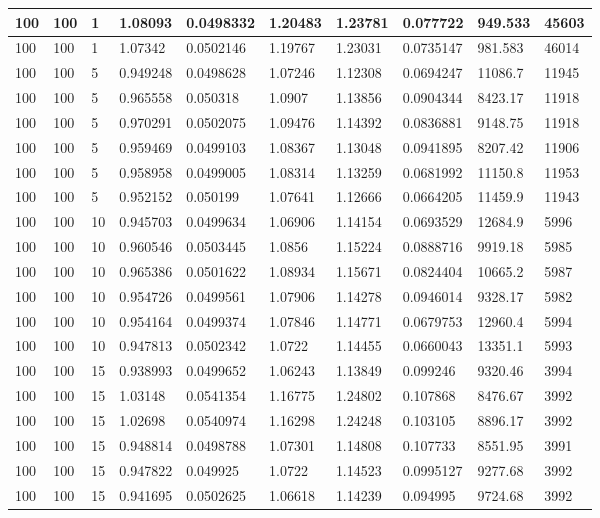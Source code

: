 \begin{landscape}
\begin{longtable}{ | l | l | l | l | l | l | l | l | l | l | }
100 & 100 & 1 & 1.08093 & 0.0498332 & 1.20483 & 1.23781 & 0.077722 & 949.533 & 45603\\ \hline
100 & 100 & 1 & 1.07342 & 0.0502146 & 1.19767 & 1.23031 & 0.0735147 & 981.583 & 46014\\ \hline
100 & 100 & 5 & 0.949248 & 0.0498628 & 1.07246 & 1.12308 & 0.0694247 & 11086.7 & 11945\\ \hline
100 & 100 & 5 & 0.965558 & 0.050318 & 1.0907 & 1.13856 & 0.0904344 & 8423.17 & 11918\\ \hline
100 & 100 & 5 & 0.970291 & 0.0502075 & 1.09476 & 1.14392 & 0.0836881 & 9148.75 & 11918\\ \hline
100 & 100 & 5 & 0.959469 & 0.0499103 & 1.08367 & 1.13048 & 0.0941895 & 8207.42 & 11906\\ \hline
100 & 100 & 5 & 0.958958 & 0.0499005 & 1.08314 & 1.13259 & 0.0681992 & 11150.8 & 11953\\ \hline
100 & 100 & 5 & 0.952152 & 0.050199 & 1.07641 & 1.12666 & 0.0664205 & 11459.9 & 11943\\ \hline
100 & 100 & 10 & 0.945703 & 0.0499634 & 1.06906 & 1.14154 & 0.0693529 & 12684.9 & 5996\\ \hline
100 & 100 & 10 & 0.960546 & 0.0503445 & 1.0856 & 1.15224 & 0.0888716 & 9919.18 & 5985\\ \hline
100 & 100 & 10 & 0.965386 & 0.0501622 & 1.08934 & 1.15671 & 0.0824404 & 10665.2 & 5987\\ \hline
100 & 100 & 10 & 0.954726 & 0.0499561 & 1.07906 & 1.14278 & 0.0946014 & 9328.17 & 5982\\ \hline
100 & 100 & 10 & 0.954164 & 0.0499374 & 1.07846 & 1.14771 & 0.0679753 & 12960.4 & 5994\\ \hline
100 & 100 & 10 & 0.947813 & 0.0502342 & 1.0722 & 1.14455 & 0.0660043 & 13351.1 & 5993\\ \hline
100 & 100 & 15 & 0.938993 & 0.0499652 & 1.06243 & 1.13849 & 0.099246 & 9320.46 & 3994\\ \hline
100 & 100 & 15 & 1.03148 & 0.0541354 & 1.16775 & 1.24802 & 0.107868 & 8476.67 & 3992\\ \hline
100 & 100 & 15 & 1.02698 & 0.0540974 & 1.16298 & 1.24248 & 0.103105 & 8896.17 & 3992\\ \hline
100 & 100 & 15 & 0.948814 & 0.0498788 & 1.07301 & 1.14808 & 0.107733 & 8551.95 & 3991\\ \hline
100 & 100 & 15 & 0.947822 & 0.049925 & 1.0722 & 1.14523 & 0.0995127 & 9277.68 & 3992\\ \hline
100 & 100 & 15 & 0.941695 & 0.0502625 & 1.06618 & 1.14239 & 0.094995 & 9724.68 & 3992\\ \hline

\end{longtable}
\end{landscape}
